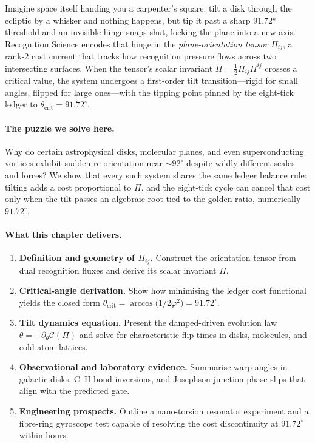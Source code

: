 \documentclass[11pt,oneside]{book}
\begin{document}
Imagine space itself handing you a carpenter’s square: tilt a disk
through the ecliptic by a whisker and nothing happens, but tip it past
a sharp 91.72° threshold and an invisible hinge snaps shut, locking
the plane into a new axis.  
Recognition Science encodes that hinge in the
\emph{plane-orientation tensor} $\Pi_{ij}$, a rank-2 cost current that
tracks how recognition pressure flows across two intersecting
surfaces.  
When the tensor’s scalar invariant
$\Pi=\tfrac12\Pi_{ij}\Pi^{ij}$ crosses a critical value, the system
undergoes a first-order tilt transition—rigid for small angles,
flipped for large ones—with the tipping point pinned by the
eight-tick ledger to $\theta_{\text{crit}}=91.72^\circ$.

\paragraph{The puzzle we solve here.}
Why do certain astrophysical disks, molecular planes, and even
superconducting vortices exhibit sudden re-orientation near
$\sim\!92^\circ$ despite wildly different scales and forces?  
We show that every such system shares the same ledger balance rule:
tilting adds a cost proportional to $\Pi$, and the eight-tick cycle
can cancel that cost only when the tilt passes an algebraic root tied
to the golden ratio, numerically $91.72^\circ$.

\paragraph{What this chapter delivers.}

\begin{enumerate}[label=\arabic*.,leftmargin=*,itemsep=3pt]
\item \textbf{Definition and geometry of $\Pi_{ij}$.}  
      Construct the orientation tensor from dual recognition fluxes
      and derive its scalar invariant $\Pi$.
\item \textbf{Critical-angle derivation.}  
      Show how minimising the ledger cost functional yields the closed
      form $\theta_{\text{crit}}=\arccos\!\bigl(1/2\varphi^{2}\bigr)
      =91.72^\circ$.
\item \textbf{Tilt dynamics equation.}  
      Present the damped-driven evolution law
      $\dot{\theta}=-\partial_\theta\mathcal{C}(\Pi)$ and solve for
      characteristic flip times in disks, molecules, and cold-atom
      lattices.
\item \textbf{Observational and laboratory evidence.}  
      Summarise warp angles in galactic disks, C\!–\!H bond inversions,
      and Josephson-junction phase slips that align with the predicted
      gate.
\item \textbf{Engineering prospects.}  
      Outline a nano-torsion resonator experiment and a fibre-ring
      gyroscope test capable of resolving the cost discontinuity at
      $91.72^\circ$ within hours.
\end{enumerate}
\end{document}

